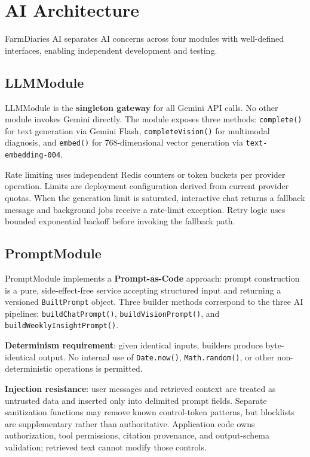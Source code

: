 \documentclass[conference]{IEEEtran}
\begin{document}
\section{AI Architecture}

FarmDiaries AI separates AI concerns across four modules with well-defined interfaces, enabling independent development and testing.

\subsection{LLMModule}

LLMModule is the \textbf{singleton gateway} for all Gemini API calls. No other module invokes Gemini directly. The module exposes three methods: \texttt{complete()} for text generation via Gemini Flash, \texttt{completeVision()} for multimodal diagnosis, and \texttt{embed()} for 768-dimensional vector generation via \texttt{text-embedding-004}.

Rate limiting uses independent Redis counters or token buckets per provider operation. Limits are deployment configuration derived from current provider quotas. When the generation limit is saturated, interactive chat returns a fallback message and background jobs receive a rate-limit exception. Retry logic uses bounded exponential backoff before invoking the fallback path.

\subsection{PromptModule}

PromptModule implements a \textbf{Prompt-as-Code} approach: prompt construction is a pure, side-effect-free service accepting structured input and returning a versioned \texttt{BuiltPrompt} object. Three builder methods correspond to the three AI pipelines: \texttt{buildChatPrompt()}, \texttt{buildVisionPrompt()}, and \texttt{buildWeeklyInsightPrompt()}.

\textbf{Determinism requirement}: given identical inputs, builders produce byte-identical output. No internal use of \texttt{Date.now()}, \texttt{Math.random()}, or other non-deterministic operations is permitted.

\textbf{Injection resistance}: user messages and retrieved context are treated as untrusted data and inserted only into delimited prompt fields. Separate sanitization functions may remove known control-token patterns, but blocklists are supplementary rather than authoritative. Application code owns authorization, tool permissions, citation provenance, and output-schema validation; retrieved text cannot modify those controls.
\end{document}
